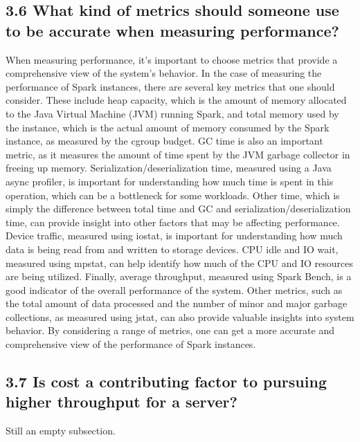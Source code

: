 \documentclass[twocolumn,10pt]{asme2e}
\begin{document}
\subsection*{3.6 What kind of metrics should someone use to be accurate when measuring performance?}
When measuring performance, it's important to choose metrics that provide a comprehensive view of the system's behavior. In the case of measuring the performance of Spark instances, there are several key metrics that one should consider. These include heap capacity, which is the amount of memory allocated to the Java Virtual Machine (JVM) running Spark, and total memory used by the instance, which is the actual amount of memory consumed by the Spark instance, as measured by the cgroup budget. GC time is also an important metric, as it measures the amount of time spent by the JVM garbage collector in freeing up memory. Serialization/deserialization time, measured using a Java async profiler, is important for understanding how much time is spent in this operation, which can be a bottleneck for some workloads. Other time, which is simply the difference between total time and GC and serialization/deserialization time, can provide insight into other factors that may be affecting performance. Device traffic, measured using iostat, is important for understanding how much data is being read from and written to storage devices. CPU idle and IO wait, measured using mpstat, can help identify how much of the CPU and IO resources are being utilized. Finally, average throughput, measured using Spark Bench, is a good indicator of the overall performance of the system. Other metrics, such as the total amount of data processed and the number of minor and major garbage collections, as measured using jstat, can also provide valuable insights into system behavior. By considering a range of metrics, one can get a more accurate and comprehensive view of the performance of Spark instances.

\subsection*{3.7 Is cost a contributing factor to pursuing higher throughput for a server?}
Still an empty subsection.

\end{document}
